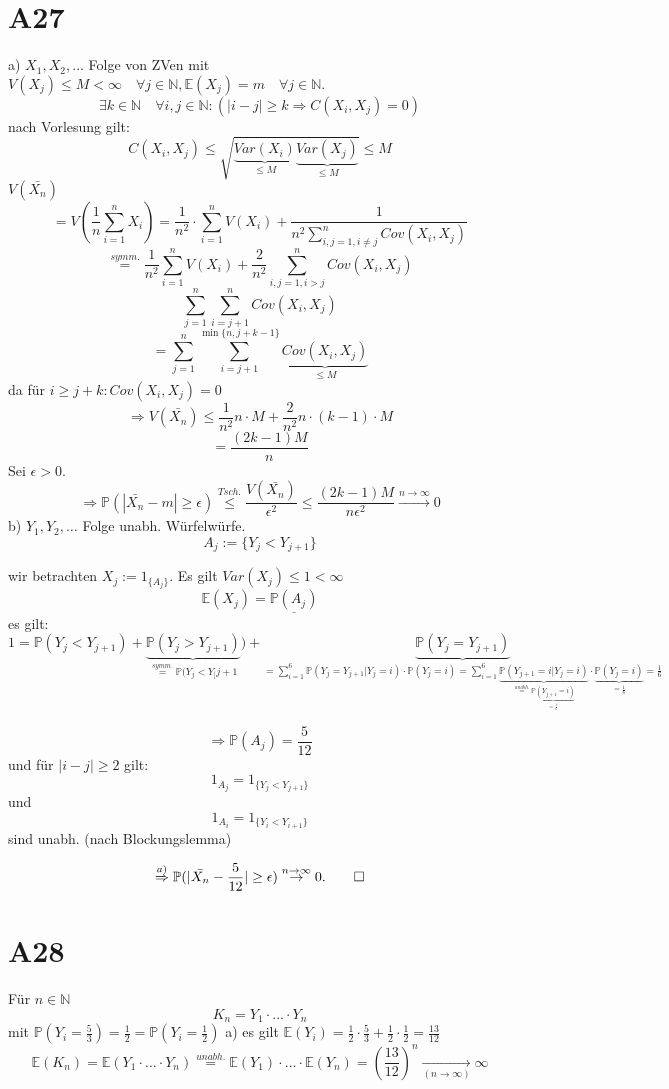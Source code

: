 \documentclass[a4paper,11pt,notitlepage]{report}
\newcommand{\N}{{\ensuremath{\mathbb{N}}}}
\newcommand{\Prim}{{\ensuremath{\mathbb{P}}}}
\newcommand{\E}{{\ensuremath{\mathbb{E}}}}
\begin{document}
\section{A27}
a) $X_1, X_2, \ldots$ Folge von ZVen mit $V(X_j) \leq M < \infty \quad \forall j \in \N, \E(X_j) = m \quad \forall j \in \N.$
$$\exists k \in \N \quad \forall i,j \in \N \colon (|i-j| \geq k \Rightarrow C(X_i, X_j) = 0)$$
nach Vorlesung gilt:
$$C(X_i, X_j) \leq \sqrt{\underbrace{Var(X_i)}_{\leq M} \underbrace{Var(X_j)}_{\leq M}} \leq M$$
$V(\bar{X_n})$
$$= V(\frac{1}{n} \sum\limits_{i=1}^n{X_i}) = \frac{1}{n^2} \cdot \sum\limits_{i=1}^n{V(X_i)} + \frac{1}{n^2 \sum\limits_{i,j = 1, i \neq j}^n{Cov(X_i, X_j)}}$$
$$\overset{symm.}{=} \frac{1}{n^2} \sum\limits_{i=1}^n{V(X_i) + \frac{2}{n^2}\sum\limits_{i,j=1, i > j}^n{Cov(X_i,X_j)}}$$
$$\sum\limits_{j=1}^n{\sum\limits_{i=j+1}^n{Cov(X_i,X_j)}}$$
$$= \sum\limits_{j=1}^n{\sum\limits_{i=j+1}^{\min \{n,j+k-1\}}{\underbrace{Cov(X_i,X_j)}_{\leq M}}}$$
da für $i \geq j+k: Cov(X_i, X_j) = 0$
$$\Rightarrow V(\bar{X_n}) \leq \frac{1}{n^2}n \cdot M + \frac{2}{n^2} n \cdot (k-1) \cdot M$$
$$= \frac{(2k-1)M}{n}$$
Sei $\epsilon > 0.$
$$\Rightarrow \Prim(|\bar{X_n}-m| \geq \epsilon) \overset{Tsch.}{\leq} \frac{V(\bar{X_n})}{\epsilon^2} \leq \frac{(2k-1)M}{n \epsilon^2} \overset{n \rightarrow \infty}{\rightarrow} 0$$
b) $Y_1, Y_2, \ldots$ Folge unabh. Würfelwürfe.
$$A_j := \{Y_j < Y_{j+1}\}$$

wir betrachten $X_j := 1_{\{A_j\}}$.
\newline
Es gilt $Var(X_j) \leq 1 < \infty$
$$\E(X_j) = \underline{\Prim(A_j)}$$
es gilt:
$$1 = \Prim(Y_j < Y_{j+1}) + \underbrace{\Prim(Y_j > Y_{j+1})}_{\overset{symm.}{=} \Prim(Y_j < Y_[j+1}) + \underbrace{\Prim(Y_j = Y_{j+1})}_{ = \sum\limits_{i=1}^6{\Prim(Y_j = Y_{j+1}|Y_j = i) \cdot \Prim(Y_j = i)} = \sum\limits_{i=1}^6{\underbrace{\Prim(Y_{j+1}=i|Y_j = i)}_{\overset{unabh.}{=} \underbrace{\Prim(Y_{j+1}=i)}_{= \frac{1}{6}}}} \cdot \underbrace{\Prim(Y_j = i)}_{= \frac{1}{6}} = \frac{1}{6}}$$

$$\Rightarrow \Prim(A_j) = \frac{5}{12}$$
und für $|i-j| \geq 2$ gilt:
$$1_{A_j} = 1_{\{Y_j < Y_{j+1}\}}$$ und
$$1_{A_i} = 1_{\{Y_i < Y_{i+1}\}}$$ sind unabh. (nach Blockungslemma)

$$\overset{a)}{\Rightarrow} \Prim(|\bar{X_n} - \frac{5}{12}| \geq \epsilon) \overset{n \rightarrow \infty}{\rightarrow} 0. \qed$$

\section{A28}
Für $n \in \N$
$$K_n = Y_1 \cdot \ldots \cdot Y_n$$ mit $\Prim(Y_i = \frac{5}{3}) = \frac{1}{2} = \Prim(Y_i = \frac{1}{2})$
\newline
a) es gilt $\E(Y_i) = \frac{1}{2} \cdot \frac{5}{3} + \frac{1}{2} \cdot \frac{1}{2} = \frac{13}{12}$
$$\E(K_n) = \E (Y_1 \cdot \ldots \cdot Y_n) \overset{unabh.}{=} \E(Y_1) \cdot \ldots \cdot \E(Y_n) = \left(\frac{13}{12} \right)^n \underset{(n \rightarrow \infty)}{\rightarrow} \infty$$
\end{document}

